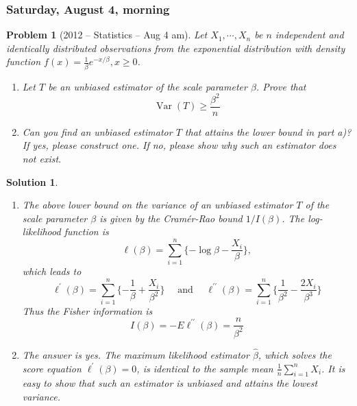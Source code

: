 \documentclass[12pt]{amsart}
\newtheorem{problem}{Problem}
\newtheorem*{solution}{Solution}
\begin{document}
\subsubsection*{Saturday, August 4, morning}
\begin{problem}[2012 -- Statistics -- Aug 4 am]
Let $X_1, \cdots, X_n$ be $n$ independent and identically distributed observations from the exponential distribution with density function $f(x)=\frac{1}{\beta} e^{-x / \beta}, x \geq 0$.
\begin{enumerate}[label=\alph*)]
\item Let $T$ be an unbiased estimator of the scale parameter $\beta$. Prove that
$$
\operatorname{Var}(T) \geq \frac{\beta^2}{n}
$$
\item Can you find an unbiased estimator $T$ that attains the lower bound in part a)? If yes, please construct one. If no, please show why such an estimator does not exist.
\end{enumerate}
\end{problem}
\begin{solution}
\begin{enumerate}[label=\alph*)]
\item The above lower bound on the variance of an unbiased estimator $T$ of the scale parameter $\beta$ is given by the Cramér-Rao bound $1 / I(\beta)$. The log-likelihood function is
$$
\ell(\beta)=\sum_{i=1}^n\{-\log \beta-\frac{X_i}{\beta}\},
$$
which leads to
$$
\ell^{\prime}(\beta)=\sum_{i=1}^n\{-\frac{1}{\beta}+\frac{X_i}{\beta^2}\} \quad \text { and } \quad \ell^{\prime \prime}(\beta)=\sum_{i=1}^n\{\frac{1}{\beta^2}-\frac{2 X_i}{\beta^3}\}
$$
Thus the Fisher information is
$$
I(\beta)=-E \ell^{\prime \prime}(\beta)=\frac{n}{\beta^2}
$$
\item The answer is yes. The maximum likelihood estimator $\widehat{\beta}$, which solves the score equation $\ell^{\prime}(\beta)=0$, is identical to the sample mean $\frac{1}{n} \sum_{i=1}^n X_i$. It is easy to show that such an estimator is unbiased and attains the lowest variance.
\end{enumerate}
\end{solution}
\end{document}
